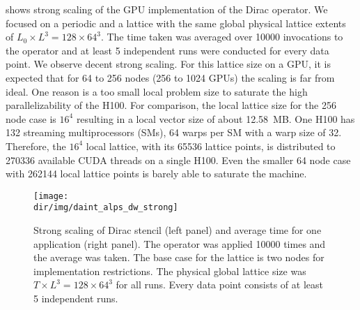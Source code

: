  shows strong scaling of the GPU implementation of the Dirac operator.
We focused on a periodic and a \Cstar lattice with the same global physical lattice extents of $L_0 \times L^{3} = 128 \times 64^{3}$.
The time taken was averaged over \num{10000} invocations to the operator and at least \num{5} independent runs were conducted for every data point.
We observe decent strong scaling.
For this lattice size on a GPU, it is expected that for \num{64} to \num{256} nodes (\num{256} to \num{1024} GPUs) the scaling is far from ideal.
One reason is a too small local problem size to saturate the high parallelizability of the H100.
For comparison, the local lattice size for the \num{256} node case is $16^{4}$ resulting in a local vector size of about \SI{12.58}{MB}.
One H100 has \num{132} streaming multiprocessors (SMs), \num{64} warps per SM with a warp size of \num{32}.
Therefore, the $16^{4}$ local lattice, with its \num{65536} lattice points, is distributed to \num{270336} available CUDA threads on a single H100.
Even the smaller \num{64} node case with \num{262144} local lattice points is barely able to saturate the machine.
\begin{figure}
    \centering
    \texttt{[image: \\dir/img/daint\_alps\_dw\_strong]}
    \caption{Strong scaling of Dirac stencil (left panel) and average time for one application (right panel). The operator was applied \num{10000} times and the average was taken. The base case for the \Cstar lattice is two nodes for implementation restrictions. The physical global lattice size was $T \times L^{3} = 128 \times 64^{3}$ for all runs. Every data point consists of at least \num{5} independent runs. }
    \label{fig:daint:alps:dw:strong}
\end{figure}

